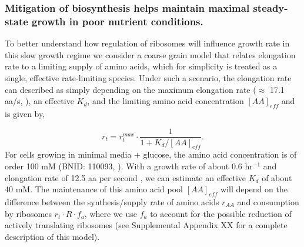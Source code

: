 
\subsubsection{Mitigation of biosynthesis helps maintain maximal steady-state growth
in poor nutrient conditions.}

To better understand how regulation of ribosomes will influence growth rate in
this slow growth regime  we consider a coarse grain model that relates
elongation rate to a limiting supply of amino acids, which for simplicity is
treated as a single, effective rate-limiting species. Under such a scenario, the
elongation rate can described as simply depending on the maximum elongation rate
($\approx$ 17.1 aa/s, \citep{dai2016, dai2018}), an effective $K_d$, and the
limiting amino acid concentration $[AA]_{eff}$ and is given by,

\begin{equation}
r_t = r_t^{max} \cdot \frac{1}{1 + K_d / [AA]_{eff}}.
\label{eq:rate_Kd}
\end{equation}
For cells growing in minimal media + glucose, the amino acid concentration is of
order 100 mM  (BNID: 110093, \citep{milo2010, bennett2009}). With a growth rate
of about 0.6 hr$^{-1}$ and elongation rate of 12.5 aa per second
\citep{dai2016}, we can estimate an effective $K_d$ of about 40 mM. The maintenance
of this amino acid pool $[AA]_{eff}$ will depend on the difference between
the synthesis/supply rate of amino acids $r_{AA}$ and consumption by ribosomes $r_t \cdot R
\cdot f_a$, where we use $f_a$ to account for the possible reduction of actively
translating ribosomes (see Supplemental Appendix XX for a complete
description of this model).

